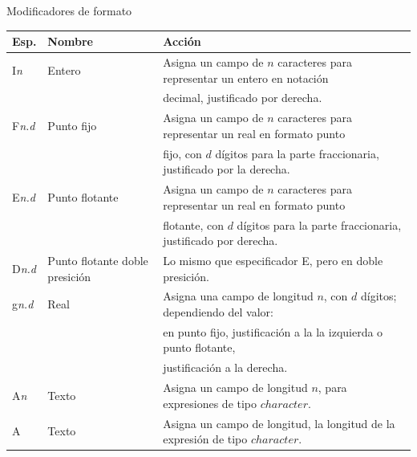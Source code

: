 \begin{frame}[fragile]{Modificadores de formato}
   \begin{table}[]
    \centering
    \label{Tabla_especificaciones}
    \resizebox{10.55cm}{!} {
      \begin{tabular}{|l|l|l|}
        \hline
        \textbf{Esp.}   & \textbf{Nombre}                   & \textbf{Acción}                                                               \\ \hline    
        I\textit{n}     & Entero                            & Asigna un campo de $n$ caracteres para representar un entero en notación      \\          
                        &                                   & decimal, justificado por derecha.                                             \\ \hline
        F\textit{n.d}   & Punto fijo                        & Asigna un campo de $n$ caracteres para representar un real en formato punto   \\    
                        &                                   & fijo, con $d$ dígitos para la parte fraccionaria, justificado por la derecha. \\ \hline
        E\textit{n.d}   & Punto flotante                    & Asigna un campo de $n$ caracteres para representar un real en formato punto   \\  
                        &                                   & flotante, con $d$ dígitos para la parte fraccionaria, justificado por derecha.\\ \hline  
        D\textit{n.d}   & Punto flotante doble presición    & Lo mismo que especificador E, pero en doble presición.                        \\ \hline
        g\textit{n.d}   & Real                              & Asigna una campo de longitud $n$, con $d$ dígitos; dependiendo del valor:     \\     
                        &                                   & en punto fijo, justificación a la la izquierda o punto flotante,              \\
                        &                                   & justificación a la derecha.                                                   \\ \hline
        A\textit{n}     & Texto                             & Asigna un campo de longitud $n$, para expresiones de tipo $character$.        \\ \hline
        A               & Texto                             & Asigna un campo de longitud, la longitud de la expresión de tipo $character$. \\ \hline

\end{tabular}}
\end{table}
\end{frame}
